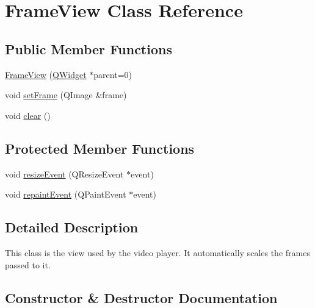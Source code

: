\hypertarget{classPlayer_1_1FrameView}{}\section{Frame\+View Class Reference}
\label{classPlayer_1_1FrameView}
\subsection*{Public Member Functions}
\begin{DoxyCompactItemize}
\item 
\hyperlink{classPlayer_1_1FrameView_a75ab7862211fa66433f92fc148ba9e7d}{Frame\+View} (\hyperlink{classPlayer_1_1QWidget}{Q\+Widget} $\ast$parent=0)
\item 
void \hyperlink{classPlayer_1_1FrameView_ab38693f5302565670675156a8f33d77c}{set\+Frame} (Q\+Image \&frame)
\item 
void \hyperlink{classPlayer_1_1FrameView_ac8bb3912a3ce86b15842e79d0b421204}{clear} ()
\end{DoxyCompactItemize}
\subsection*{Protected Member Functions}
\begin{DoxyCompactItemize}
\item 
void \hyperlink{classPlayer_1_1FrameView_a6fbc07cec19868c41d513b9ef8343e9a}{resize\+Event} (Q\+Resize\+Event $\ast$event)
\item 
void \hyperlink{classPlayer_1_1FrameView_a67e5a053c3728683d415a35d1eafa5c2}{repaint\+Event} (Q\+Paint\+Event $\ast$event)
\end{DoxyCompactItemize}


\subsection{Detailed Description}
This class is the view used by the video player. It automatically scales the frames passed to it. 

\subsection{Constructor \& Destructor Documentation}
\hypertarget{classPlayer_1_1FrameView_a75ab7862211fa66433f92fc148ba9e7d}{}
